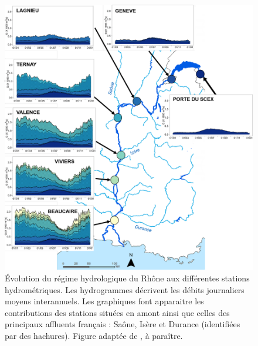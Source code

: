 \documentclass[11pt]{article}
\begin{document}
	
	\begin{figure}[h!]
	\centering
		\includegraphics[width=.6\linewidth]{Figures/RégimeRhône.pdf}
        \caption{Évolution du régime hydrologique du Rhône aux différentes stations hydrométriques. Les hydrogrammes décrivent les débits journaliers moyens interannuels. Les graphiques font apparaitre les contributions des stations situées en amont ainsi que celles des principaux affluents français : Saône, Isère et Durance (identifiées par des hachures). Figure adaptée de \cite{le_coz_flux_nodate}, à paraître.}	
		\label{fig:BV}
	\end{figure}
\end{document}
